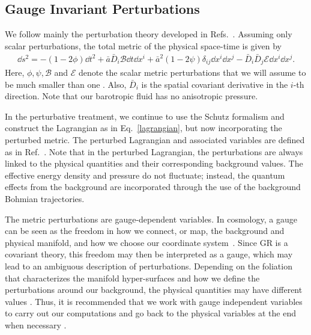 \documentclass[a4paper,11pt]{article}
\begin{document}
\subsection{Gauge Invariant Perturbations}

We follow mainly the perturbation theory developed in Refs.~\cite{covariant_bardeen,
	Vitenti2012}. Assuming only scalar perturbations, the total metric of the physical
space-time is given by
\begin{align}
	\label{physmetric-pert}
	\dd s^2 = -(1- 2 \phi)\dd t^2 + \bar{a}\bar{D}_i \mathcal{B} \dd t \dd x^i +
	\bar{a}^2(1-2 \psi)\delta_{ij}\dd x^i \dd x^j - \bar{D}_i\bar{D}_j \mathcal{E} \dd x^i \dd x^j
	.\end{align}
Here, $\phi, \psi, \mathcal{B}$ and $\mathcal{E}$ denote the scalar metric perturbations
that we will assume to be much smaller than one \cite{vitenti2012large}. Also,
$\bar{D}_i$ is the spatial covariant derivative in the $i$-th direction. Note that our
barotropic fluid has no anisotropic pressure.

In the perturbative treatment, we continue to use the Schutz formalism and construct the
Lagrangian as in Eq.~\eqref{lagrangian}, but now incorporating the perturbed metric. The
perturbed Lagrangian and associated variables are defined as in Ref.~\cite{Vitenti2012}.
Note that in the perturbed Lagrangian, the perturbations are always linked to the
physical quantities and their corresponding background values. The effective energy
density and pressure do not fluctuate; instead, the quantum effects from the background
are incorporated through the use of the background Bohmian trajectories.

The metric perturbations are gauge-dependent variables. In cosmology, a gauge can be
seen as the freedom in how we connect, or map, the background and physical manifold, and
how we choose our coordinate system~\cite{vitenti2012large}. Since GR is a covariant
theory, this freedom may then be interpreted as a gauge, which may lead to an ambiguous
description of perturbations. Depending on the foliation that characterizes the manifold
hyper-surfaces and how we define the perturbations around our background, the physical
quantities may have different values \cite{covariant_bardeen}. Thus, it is recommended
that we work with gauge independent variables to carry out our computations and go back
to the physical variables at the end when necessary \cite{mukhanov2005physical}.
\end{document}
